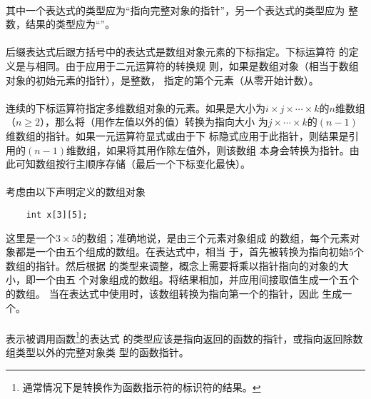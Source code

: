 \constraint
\paragraph{}
其中一个表达式的类型应为``指向完整对象的指针''，另一个表达式的类型应为
整数，结果的类型应为``''。

\semantic
\paragraph{}
后缀表达式后跟方括号\tm{[]}中的表达式是数组对象元素的下标指定。下标运算符\tm{[]}
的定义是与相同。由于应用于二元\tm{+}运算符的转换规
则，如果是数组对象（相当于数组对象的初始元素的指针），是整数，
指定的第个元素（从零开始计数）。

\paragraph{}
连续的下标运算符指定多维数组对象的元素。如果是大小为$i\times j\times\cdots
\times k$的$n$维数组（$n\ge 2$），那么将（用作左值以外的值）转换为指向大小
为$j\times\cdots\times k$的$(n-1)$维数组的指针。如果一元\tm{*}运算符显式或由于下
标隐式应用于此指针，则结果是引用的$(n-1)$维数组，如果将其用作除左值外，则该数组
本身会转换为指针。由此可知数组按行主顺序存储（最后一个下标变化最快）。

\paragraph{}
\ex 考虑由以下声明定义的数组对象
\begin{lstlisting}
    int x[3][5];
\end{lstlisting}
这里是一个$3\times 5$的数组；准确地说，是由三个元素对象组成
的数组，每个元素对象都是一个由五个组成的数组。在表达式中，相当
于，首先被转换为指向初始$5$个数组的指针。然后根据
的类型来调整，概念上需要将乘以指针指向的对象的大小，即一个由五
个对象组成的数组。将结果相加，并应用间接取值生成一个五个的数组。
当在表达式中使用时，该数组转换为指向第一个的指针，因此
生成一个。


\constraint
\paragraph{}
表示被调用函数\footnote{通常情况下是转换作为函数指示符的标识符的结果。}的表达式
的类型应该是指向返回的函数的指针，或指向返回除数组类型以外的完整对象类
型的函数指针。


